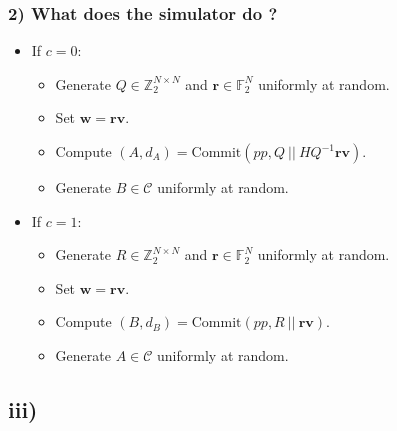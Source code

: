 \documentclass{scrartcl}
\begin{document}
\subsubsection*{2) What does the simulator do ?}
\begin{itemize}
  \renewcommand\labelitemi{--}
  \renewcommand\labelitemii{$\bullet$}
  \item If $c=0$:
  \begin{itemize}
    \item Generate $Q \in \mathbb{Z}_2^{N \times N}$ and $\mathbf{r} \in \mathbb{F}_2^N$ uniformly at random.
    \item Set $\mathbf{w} = \mathbf{rv}$.
    \item Compute $(A, d_A) = \text{Commit}(pp, Q\ ||\ HQ^{-1}\mathbf{rv})$.
    \item Generate $B \in \mathcal{C}$ uniformly at random. 
  \end{itemize}

  \item If $c=1$:
  \begin{itemize}
    \item Generate $R \in \mathbb{Z}_2^{N \times N}$ and $\mathbf{r} \in \mathbb{F}_2^N$ uniformly at random.
    \item Set $\mathbf{w} = \mathbf{rv}$.
    \item Compute $(B, d_B) = \text{Commit}(pp, R\ ||\ \mathbf{rv})$.
    \item Generate $A \in \mathcal{C}$ uniformly at random. 
  \end{itemize}
\end{itemize}

\subsection*{iii)}
\end{document}
